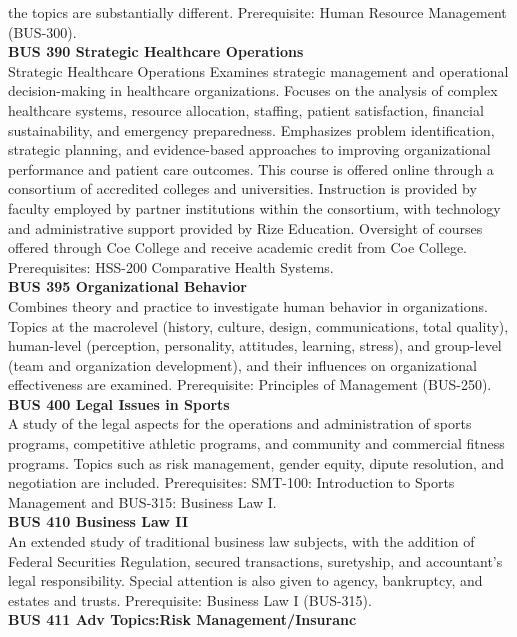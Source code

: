 \documentclass[
  letterpaper,
]{scrbook}
\begin{document}
the topics are substantially different. Prerequisite: Human Resource
Management (BUS-300).\\
\textbf{BUS 390 Strategic Healthcare Operations}\\
Strategic Healthcare Operations Examines strategic management and
operational decision-making in healthcare organizations. Focuses on the
analysis of complex healthcare systems, resource allocation, staffing,
patient satisfaction, financial sustainability, and emergency
preparedness. Emphasizes problem identification, strategic planning, and
evidence-based approaches to improving organizational performance and
patient care outcomes. This course is offered online through a
consortium of accredited colleges and universities. Instruction is
provided by faculty employed by partner institutions within the
consortium, with technology and administrative support provided by Rize
Education. Oversight of courses offered through Coe College and receive
academic credit from Coe College. Prerequisites: HSS-200 Comparative
Health Systems.\\
\textbf{BUS 395 Organizational Behavior}\\
Combines theory and practice to investigate human behavior in
organizations. Topics at the macrolevel (history, culture, design,
communications, total quality), human-level (perception, personality,
attitudes, learning, stress), and group-level (team and organization
development), and their influences on organizational effectiveness are
examined. Prerequisite: Principles of Management (BUS-250).\\
\textbf{BUS 400 Legal Issues in Sports}\\
A study of the legal aspects for the operations and administration of
sports programs, competitive athletic programs, and community and
commercial fitness programs. Topics such as risk management, gender
equity, dipute resolution, and negotiation are included. Prerequisites:
SMT-100: Introduction to Sports Management and BUS-315: Business Law
I.\\
\textbf{BUS 410 Business Law II}\\
An extended study of traditional business law subjects, with the
addition of Federal Securities Regulation, secured transactions,
suretyship, and accountant's legal responsibility. Special attention is
also given to agency, bankruptcy, and estates and trusts. Prerequisite:
Business Law I (BUS-315).\\
\textbf{BUS 411 Adv Topics:Risk Management/Insuranc}\\
\end{document}
